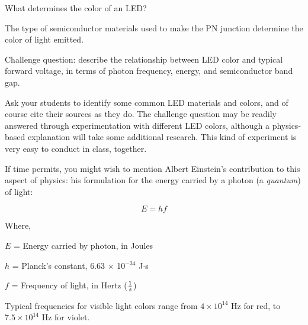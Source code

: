 

What determines the color of an LED?







The type of semiconductor materials used to make the PN junction determine the color of light emitted.

\vskip 10pt

Challenge question: describe the relationship between LED color and typical forward voltage, in terms of photon frequency, energy, and semiconductor band gap.







Ask your students to identify some common LED materials and colors, and of course cite their sources as they do.  The challenge question may be readily answered through experimentation with different LED colors, although a physics-based explanation will take some additional research.  This kind of experiment is very easy to conduct in class, together.

If time permits, you might wish to mention Albert Einstein's contribution to this aspect of physics: his formulation for the energy carried by a photon (a {\it quantum}) of light:

$$E = hf$$

\noindent
Where,

$E$ = Energy carried by photon, in Joules

$h$ = Planck's constant, 6.63 $\times$ 10$^{-34}$ J$\cdot$s

$f$ = Frequency of light, in Hertz ($1 \over s$)

Typical frequencies for visible light colors range from $4 \times 10^{14}$ Hz for red, to $7.5 \times 10^{14}$ Hz for violet.




